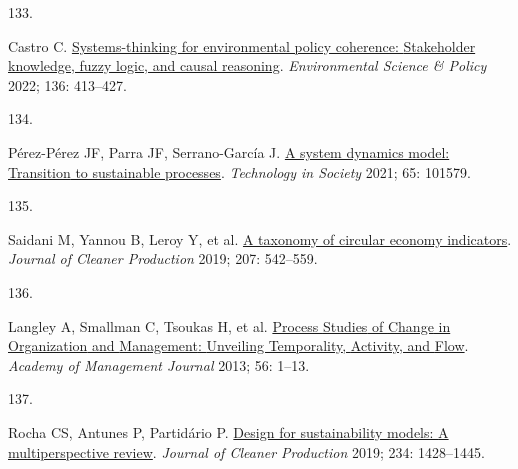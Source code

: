 \documentclass[
  12pt,
  a4paperpaper,
  onecolumn]{article}
\newlength{\cslhangindent}
\newlength{\csllabelwidth}
\newlength{\cslentryspacingunit} %
\newenvironment{CSLReferences}[2] %
 {%
  \setlength{\parindent}{0pt}
  \ifodd #1
  \let\oldpar\par
  \def\par{\hangindent=\cslhangindent\oldpar}
  \fi
  \setlength{\parskip}{#2\cslentryspacingunit}
 }%
 {}
\newcommand{\CSLLeftMargin}[1]{\parbox[t]{\csllabelwidth}{#1}}
\newcommand{\CSLRightInline}[1]{\parbox[t]{\linewidth - \csllabelwidth}{#1}\break}
\begin{document}
\begin{CSLReferences}{0}{0}
\leavevmode{}%
\CSLLeftMargin{133. }%
\CSLRightInline{Castro C.
\href{https://doi.org/10.1016/j.envsci.2022.07.001}{Systems-thinking for
environmental policy coherence: {Stakeholder} knowledge, fuzzy logic,
and causal reasoning}. \emph{Environmental Science \& Policy} 2022; 136:
413--427.}

\leavevmode{}%
\CSLLeftMargin{134. }%
\CSLRightInline{Pérez-Pérez JF, Parra JF, Serrano-García J.
\href{https://doi.org/10.1016/j.techsoc.2021.101579}{A system dynamics
model: {Transition} to sustainable processes}. \emph{Technology in
Society} 2021; 65: 101579.}

\leavevmode{}%
\CSLLeftMargin{135. }%
\CSLRightInline{Saidani M, Yannou B, Leroy Y, et al.
\href{https://doi.org/10.1016/j.jclepro.2018.10.014}{A taxonomy of
circular economy indicators}. \emph{Journal of Cleaner Production} 2019;
207: 542--559.}

\leavevmode{}%
\CSLLeftMargin{136. }%
\CSLRightInline{Langley A, Smallman C, Tsoukas H, et al.
\href{https://doi.org/10.5465/amj.2013.4001}{Process {Studies} of
{Change} in {Organization} and {Management}: {Unveiling Temporality},
{Activity}, and {Flow}}. \emph{Academy of Management Journal} 2013; 56:
1--13.}

\leavevmode{}%
\CSLLeftMargin{137. }%
\CSLRightInline{Rocha CS, Antunes P, Partidário P.
\href{https://doi.org/10.1016/j.jclepro.2019.06.108}{Design for
sustainability models: {A} multiperspective review}. \emph{Journal of
Cleaner Production} 2019; 234: 1428--1445.}

\end{CSLReferences}
\end{document}
